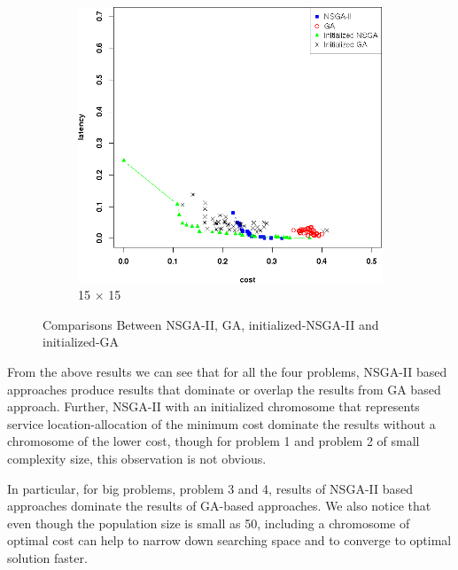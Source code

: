 \documentclass{llncs}
\begin{document}
\begin{figure}[H]
\begin{subfigure}[b]{0.45\textwidth}
	\end{subfigure}
	\begin{subfigure}[b]{0.45\textwidth}
		\includegraphics[width=\textwidth]{pics/pop_50_gen_50_15_times_15_sufficient_initialisation.png}
		\caption{15 $\times$ 15}
	\end{subfigure}
	\caption{Comparisons Between NSGA-II, GA, initialized-NSGA-II and initialized-GA}\label{fig:c1}
\end{figure}

From the above results we can see that for all the four problems, NSGA-II based approaches produce results that dominate or overlap the results from GA based approach. Further,
NSGA-II with an initialized chromosome that represents service location-allocation of the minimum cost dominate the results without a chromosome of the lower cost, though for problem 1 and
problem 2 of small complexity size, this observation is not obvious.

In particular, for big problems, problem 3 and 4, results of NSGA-II based approaches dominate the results of GA-based approaches. We also notice that even though the population size
is small as 50, including a chromosome of optimal cost can help to narrow down searching space and to converge to optimal solution faster.
\end{document}

